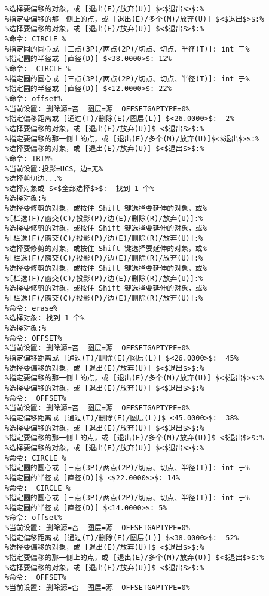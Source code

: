 \begin{lstlisting}
%选择要偏移的对象，或 [退出(E)/放弃(U)] $<$退出$>$:%
%指定要偏移的那一侧上的点，或 [退出(E)/多个(M)/放弃(U)] $<$退出$>$:%
%选择要偏移的对象，或 [退出(E)/放弃(U)] $<$退出$>$:%
%命令: CIRCLE %
%指定圆的圆心或 [三点(3P)/两点(2P)/切点、切点、半径(T)]: int 于%
%指定圆的半径或 [直径(D)] $<38.0000>$: 12%
%命令:  CIRCLE %
%指定圆的圆心或 [三点(3P)/两点(2P)/切点、切点、半径(T)]: int 于%
%指定圆的半径或 [直径(D)] $<12.0000>$: 22%
%命令: offset%
%当前设置: 删除源=否  图层=源  OFFSETGAPTYPE=0%
%指定偏移距离或 [通过(T)/删除(E)/图层(L)] $<26.0000>$:  2%
%选择要偏移的对象，或 [退出(E)/放弃(U)]$ <$退出$>$:%
%指定要偏移的那一侧上的点，或 [退出(E)/多个(M)/放弃(U)]$<$退出$>$:%
%选择要偏移的对象，或 [退出(E)/放弃(U)] $<$退出$>$:%
%命令: TRIM%
%当前设置:投影=UCS，边=无%
%选择剪切边...%
%选择对象或 $<$全部选择$>$:  找到 1 个%
%选择对象:%
%选择要修剪的对象，或按住 Shift 键选择要延伸的对象，或%
%[栏选(F)/窗交(C)/投影(P)/边(E)/删除(R)/放弃(U)]:%
%选择要修剪的对象，或按住 Shift 键选择要延伸的对象，或%
%[栏选(F)/窗交(C)/投影(P)/边(E)/删除(R)/放弃(U)]:%
%选择要修剪的对象，或按住 Shift 键选择要延伸的对象，或%
%[栏选(F)/窗交(C)/投影(P)/边(E)/删除(R)/放弃(U)]:%
%选择要修剪的对象，或按住 Shift 键选择要延伸的对象，或%
%[栏选(F)/窗交(C)/投影(P)/边(E)/删除(R)/放弃(U)]:%
%选择要修剪的对象，或按住 Shift 键选择要延伸的对象，或%
%[栏选(F)/窗交(C)/投影(P)/边(E)/删除(R)/放弃(U)]:%
%命令: erase%
%选择对象: 找到 1 个%
%选择对象:%
%命令: OFFSET%
%当前设置: 删除源=否  图层=源  OFFSETGAPTYPE=0%
%指定偏移距离或 [通过(T)/删除(E)/图层(L)] $<26.0000>$:  45%
%选择要偏移的对象，或 [退出(E)/放弃(U)] $<$退出$>$:%
%指定要偏移的那一侧上的点，或 [退出(E)/多个(M)/放弃(U)] $<$退出$>$:%
%选择要偏移的对象，或 [退出(E)/放弃(U)] $<$退出$>$:%
%命令:  OFFSET%
%当前设置: 删除源=否  图层=源  OFFSETGAPTYPE=0%
%指定偏移距离或 [通过(T)/删除(E)/图层(L)]$ <45.0000>$:  38%
%选择要偏移的对象，或 [退出(E)/放弃(U)] $<$退出$>$:%
%指定要偏移的那一侧上的点，或 [退出(E)/多个(M)/放弃(U)]$ <$退出$>$:%
%选择要偏移的对象，或 [退出(E)/放弃(U)] $<$退出$>$:%
%命令: CIRCLE %
%指定圆的圆心或 [三点(3P)/两点(2P)/切点、切点、半径(T)]: int 于%
%指定圆的半径或 [直径(D)]$ <$22.0000$>$: 14%
%命令:  CIRCLE %
%指定圆的圆心或 [三点(3P)/两点(2P)/切点、切点、半径(T)]: int 于%
%指定圆的半径或 [直径(D)] $<14.0000>$: 5%
%命令: offset%
%当前设置: 删除源=否  图层=源  OFFSETGAPTYPE=0%
%指定偏移距离或 [通过(T)/删除(E)/图层(L)] $<38.0000>$:  52%
%选择要偏移的对象，或 [退出(E)/放弃(U)]$ <$退出$>$:%
%指定要偏移的那一侧上的点，或 [退出(E)/多个(M)/放弃(U)] $<$退出$>$:%
%选择要偏移的对象，或 [退出(E)/放弃(U)]$ <$退出$>$:%
%命令:  OFFSET%
%当前设置: 删除源=否  图层=源  OFFSETGAPTYPE=0%

\end{lstlisting}
